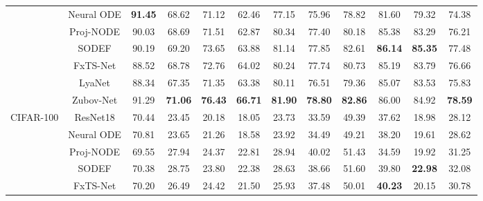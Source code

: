 \documentclass[journal]{IEEEtran}
\begin{document}
\begin{table}[ht]
\begin{tabular}{cccccccccccc}
		& Neural ODE      & \textbf{91.45}            & 68.62             & 71.12          & 62.46          & 77.15            & 75.96            & 78.82           & 81.60               & 79.32             & 74.38        \\
		& Proj-NODE       &90.03	        & 68.69				& 71.51			 & 62.87		  & 80.34			 & 77.40				& 80.18			  & 85.38				& 83.29				& 76.21       \\
		& SODEF           & 90.19            & 69.20             & 73.65          & 63.88          & 81.14            & 77.85            & 82.61           & \textbf{86.14}      & \textbf{85.35}    & 77.48        \\
		& FxTS-Net        & 88.52            & 68.78             & 72.76          & 64.02          & 80.24            & 77.74            & 80.73           & 85.19               & 83.79             & 76.66        \\
		& LyaNet          & 88.34            & 67.35             & 71.35          & 63.38          & 80.11            & 76.51            & 79.36           & 85.07               & 83.53             & 75.83        \\
		& Zubov-Net       & 91.29   		& \textbf{71.06}    & \textbf{76.43} & \textbf{66.71} & \textbf{81.90}   & \textbf{78.80}   & \textbf{82.86}  & 86.00               & 84.92            &  \textbf{78.59}       \\ \midrule
		\multirow{6}{*}{CIFAR-100}  & ResNet18        & 70.44            & 23.45             & 20.18          & 18.05          & 23.73            & 33.59            & 49.39           & 37.62               & 18.98             & 28.12     \\
		& Neural ODE      & 70.81            & 23.65             & 21.26          & 18.58          & 23.92            & 34.49            & 49.21           & 38.20               & 19.61             & 28.62        \\
		& Proj-NODE	      & 69.55 	         & 27.94 	         & 24.37 	      & 22.81 	       & 28.94 	          & 40.02 	         & 51.43  	       & 34.59 	             & 19.92 	         & 31.25 \\	
		& SODEF           & 70.38            & 28.75             & 23.80          & 22.38          & 28.63            & 38.66            & 51.60           & 39.80               & \textbf{22.98}    & 32.08        \\
		& FxTS-Net        & 70.20            & 26.49             & 24.42          & 21.50          & 25.93            & 37.48            & 50.01           & \textbf{40.23}      & 20.15             & 30.78        \\

\end{tabular}
\end{table}
\end{document}
